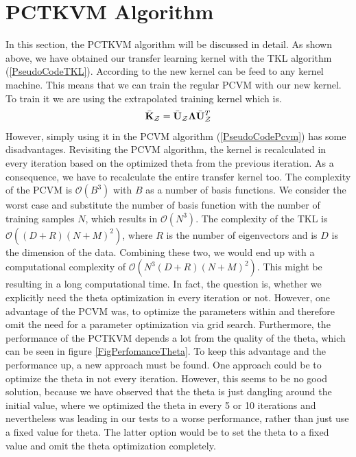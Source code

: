 \section{PCTKVM Algorithm}\label{InSecAlgo}
In this section, the \acl{PCTKVM} algorithm will be discussed in detail.
As shown above, we have obtained our transfer learning kernel with the \acs{TKL} algorithm (\ref{PseudoCodeTKL}).
According to \cite{Long.2015} the new kernel can be feed to any kernel machine.
This means that we can train the regular \acf{PCVM} with our new kernel.
To train it we are using the extrapolated training kernel which is.
\begin{equation}
	\bar{\mathbf{K}}_\mathcal{Z} = \bar{\mathbf{U}}_\mathcal{Z}\mathbf{\Lambda}\bar{\mathbf{U}}_\mathcal{Z}^T
\end{equation}
However, simply using it in the \acs{PCVM} algorithm (\ref{PseudoCodePcvm}) has some disadvantages.
Revisiting the \acs{PCVM} algorithm, the kernel is recalculated in every iteration based on the optimized theta from the previous iteration.
As a consequence, we have to recalculate the entire transfer kernel too.
The complexity of the \acs{PCVM} is $\mathcal{O}(B^3)$ with $B$ as a number of basis functions.
We consider the worst case and substitute the number of basis function with the number of training samples $N$, which results in $\mathcal{O}(N^3)$.
The complexity of the \acs{TKL} is $\mathcal{O}((D+R)(N+M)^2)$, where $R$ is the number of eigenvectors and is $D$ is the dimension of the data. Combining these two, we would end up with a computational complexity of $\mathcal{O}(N^3(D+R)(N+M)^2)$.
This might be resulting in a long computational time.
In fact, the question is, whether we explicitly need the theta optimization in every iteration or not.
However, one advantage of the \acs{PCVM} was, to optimize the parameters within and therefore omit the need for a parameter optimization via grid search.
Furthermore, the performance of the \acs{PCTKVM} depends a lot from the quality of the theta, which can be seen in figure \ref{FigPerfomanceTheta}.
To keep this advantage and the performance up, a new approach must be found.
One approach could be to optimize the theta in not every iteration.
However, this seems to be no good solution, because we have observed that the theta is just dangling around the initial value, where we optimized the theta in every 5 or 10 iterations and nevertheless was leading in our tests to a worse performance, rather than just use a fixed value for theta.
The latter option would be to set the theta to a fixed value and omit the theta optimization completely.

